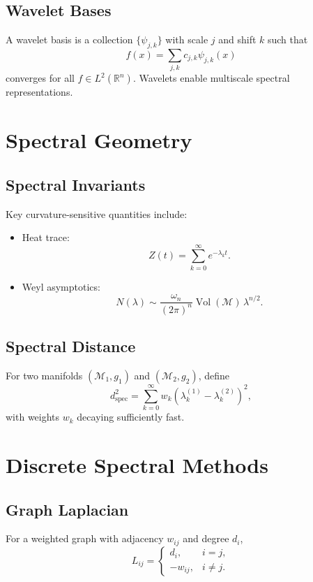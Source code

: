 \subsection{Wavelet Bases}

A wavelet basis is a collection $\{\psi_{j,k}\}$ with scale $j$ and shift $k$ such that
\[
f(x) = \sum_{j,k} c_{j,k} \psi_{j,k}(x)
\]
converges for all $f\in L^2(\mathbb{R}^n)$.
Wavelets enable multiscale spectral representations.

\section{Spectral Geometry}

\subsection{Spectral Invariants}

Key curvature-sensitive quantities include:

\begin{itemize}
\item Heat trace:
\[
Z(t) = \sum_{k=0}^\infty e^{-\lambda_k t}.
\]
\item Weyl asymptotics:
\[
N(\lambda)
  \sim \frac{\omega_n}{(2\pi)^n}
       \operatorname{Vol}(\mathcal{M})\, \lambda^{n/2}.
\]
\end{itemize}

\subsection{Spectral Distance}

For two manifolds $(\mathcal{M}_1,g_1)$ and $(\mathcal{M}_2,g_2)$, define
\[
d_{\mathrm{spec}}^2
  = \sum_{k=0}^\infty
    w_k \left(\lambda_k^{(1)} - \lambda_k^{(2)}\right)^2,
\]
with weights $w_k$ decaying sufficiently fast.

\section{Discrete Spectral Methods}

\subsection{Graph Laplacian}

For a weighted graph with adjacency $w_{ij}$ and degree $d_i$,
\[
L_{ij} = \begin{cases}
 d_i, & i=j,\\
 -w_{ij}, & i\ne j.
\end{cases}
\]

